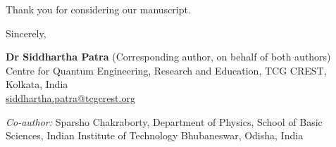 \documentclass[11pt,a4paper]{article}
\begin{document}
Thank you for considering our manuscript.

Sincerely,

\vspace{1.1cm} %

\textbf{Dr Siddhartha Patra} (Corresponding author, on behalf of both authors)\\
Centre for Quantum Engineering, Research and Education, TCG CREST,
Kolkata, India\\
\href{mailto:siddhartha.patra@tcgcrest.org}{siddhartha.patra@tcgcrest.org}

\smallskip
\textit{Co-author:} Sparsho Chakraborty, Department of Physics, School of
Basic Sciences, Indian Institute of Technology Bhubaneswar, Odisha, India
\end{document}

